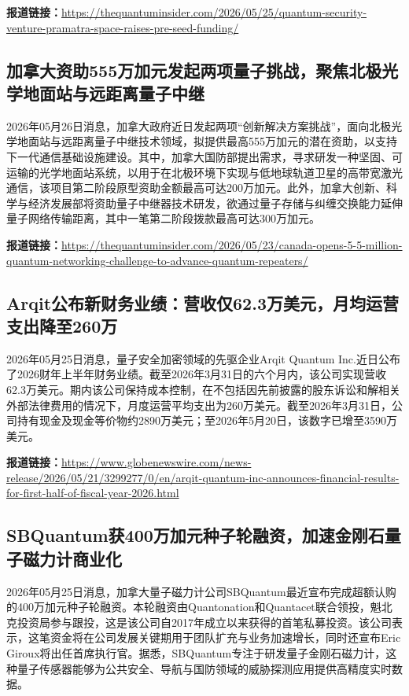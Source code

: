 \documentclass[12pt,a4paper]{ctexart}
\begin{document}
\noindent\textbf{报道链接：}\url{https://thequantuminsider.com/2026/05/25/quantum-security-venture-pramatra-space-raises-pre-seed-funding/}

\subsection{ 加拿大资助555万加元发起两项量子挑战，聚焦北极光学地面站与远距离量子中继 }

2026年05月26日消息，加拿大政府近日发起两项“创新解决方案挑战”，面向北极光学地面站与远距离量子中继技术领域，拟提供最高555万加元的潜在资助，以支持下一代通信基础设施建设。其中，加拿大国防部提出需求，寻求研发一种坚固、可运输的光学地面站系统，以用于在北极环境下实现与低地球轨道卫星的高带宽激光通信，该项目第二阶段原型资助金额最高可达200万加元。此外，加拿大创新、科学与经济发展部将资助量子中继器技术研发，欲通过量子存储与纠缠交换能力延伸量子网络传输距离，其中一笔第二阶段拨款最高可达300万加元。

\noindent\textbf{报道链接：}\url{https://thequantuminsider.com/2026/05/23/canada-opens-5-5-million-quantum-networking-challenge-to-advance-quantum-repeaters/}

\subsection{ Arqit公布新财务业绩：营收仅62.3万美元，月均运营支出降至260万 }

2026年05月25日消息，量子安全加密领域的先驱企业Arqit Quantum Inc.近日公布了2026财年上半年财务业绩。截至2026年3月31日的六个月内，该公司实现营收62.3万美元。期内该公司保持成本控制，在不包括因先前披露的股东诉讼和解相关外部法律费用的情况下，月度运营平均支出为260万美元。截至2026年3月31日，公司持有现金及现金等价物约2890万美元；至2026年5月20日，该数字已增至3590万美元。

\noindent\textbf{报道链接：}\url{https://www.globenewswire.com/news-release/2026/05/21/3299277/0/en/arqit-quantum-inc-announces-financial-results-for-first-half-of-fiscal-year-2026.html}

\subsection{ SBQuantum获400万加元种子轮融资，加速金刚石量子磁力计商业化 }

2026年05月25日消息，加拿大量子磁力计公司SBQuantum最近宣布完成超额认购的400万加元种子轮融资。本轮融资由Quantonation和Quantacet联合领投，魁北克投资局参与跟投，这是该公司自2017年成立以来获得的首笔私募投资。该公司表示，这笔资金将在公司发展关键期用于团队扩充与业务加速增长，同时还宣布Eric Giroux将出任首席执行官。据悉，SBQuantum专注于研发量子金刚石磁力计，这种量子传感器能够为公共安全、导航与国防领域的威胁探测应用提供高精度实时数据。
\end{document}
